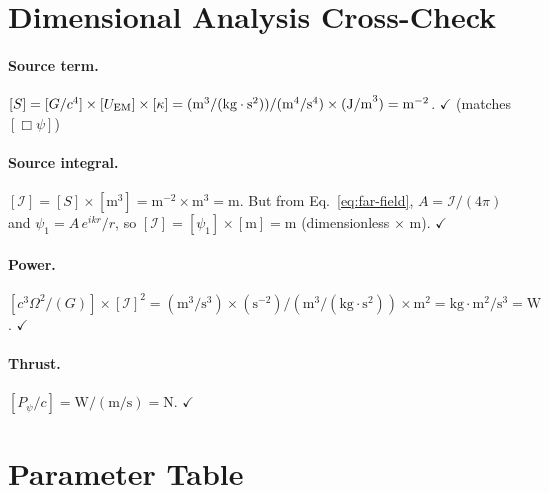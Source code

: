 \documentclass[11pt]{article}
\begin{document}
\appendix
\section{Dimensional Analysis Cross-Check}\label{app:dimensions}

\paragraph{Source term.}
$[S] = [G/c^4]\times[U_{\rm EM}]\times[\kappa] =
(\text{m}^3/(\text{kg}\cdot\text{s}^2))/(\text{m}^4/\text{s}^4)
\times (\text{J/m}^3) = \text{m}^{-2}$. $\checkmark$ (matches $[\Box\psi]$)

\paragraph{Source integral.}
$[\mathcal{I}] = [S]\times[\text{m}^3] = \text{m}^{-2}\times\text{m}^3 = \text{m}$.
But from Eq.~\eqref{eq:far-field}, $A = \mathcal{I}/(4\pi)$ and $\psi_1 = A\,e^{ikr}/r$,
so $[\mathcal{I}] = [\psi_1]\times[\text{m}] = \text{m}$ (dimensionless $\times$ m). $\checkmark$

\paragraph{Power.}
$[c^3\Omega^2/(G)] \times [\mathcal{I}]^2 =
(\text{m}^3/\text{s}^3)\times(\text{s}^{-2})/(\text{m}^3/(\text{kg}\cdot\text{s}^2))
\times \text{m}^2 = \text{kg}\cdot\text{m}^2/\text{s}^3 = \text{W}$. $\checkmark$

\paragraph{Thrust.}
$[P_\psi/c] = \text{W}/(\text{m/s}) = \text{N}$. $\checkmark$

\section{Parameter Table}\label{app:parameters}
\end{document}
